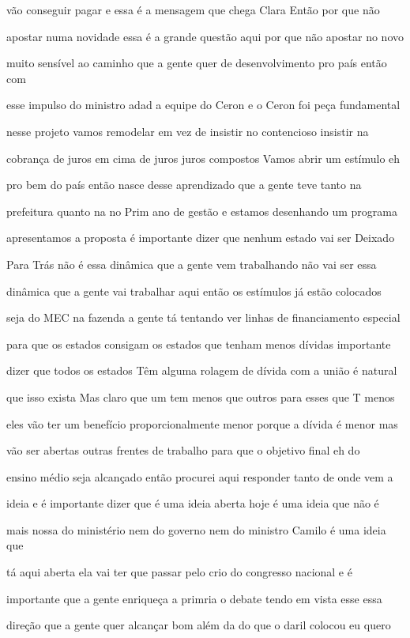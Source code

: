 \documentclass[a4paper,12pt]{article}
\begin{document}
vão conseguir pagar e essa é a mensagem que chega Clara Então por que não

apostar numa novidade essa é a grande questão aqui por que não apostar no novo

muito sensível ao caminho que a gente quer de desenvolvimento pro país então com

esse impulso do ministro adad a equipe do Ceron e o Ceron foi peça fundamental

nesse projeto vamos remodelar em vez de insistir no contencioso insistir na

cobrança de juros em cima de juros juros compostos Vamos abrir um estímulo eh

pro bem do país então nasce desse aprendizado que a gente teve tanto na

prefeitura quanto na no Prim ano de gestão e estamos desenhando um programa

apresentamos a proposta é importante dizer que nenhum estado vai ser Deixado

Para Trás não é essa dinâmica que a gente vem trabalhando não vai ser essa

dinâmica que a gente vai trabalhar aqui então os estímulos já estão colocados

seja do MEC na fazenda a gente tá tentando ver linhas de financiamento especial

para que os estados consigam os estados que tenham menos dívidas importante

dizer que todos os estados Têm alguma rolagem de dívida com a união é natural

que isso exista Mas claro que um tem menos que outros para esses que T menos

eles vão ter um benefício proporcionalmente menor porque a dívida é menor mas

vão ser abertas outras frentes de trabalho para que o objetivo final eh do

ensino médio seja alcançado então procurei aqui responder tanto de onde vem a

ideia e é importante dizer que é uma ideia aberta hoje é uma ideia que não é

mais nossa do ministério nem do governo nem do ministro Camilo é uma ideia que

tá aqui aberta ela vai ter que passar pelo crio do congresso nacional e é

importante que a gente enriqueça a primria o debate tendo em vista esse essa

direção que a gente quer alcançar bom além da do que o daril colocou eu quero
\end{document}
